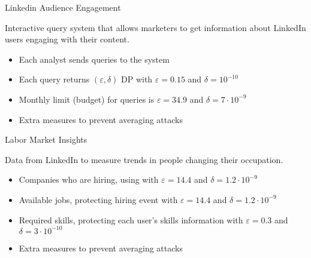 \documentclass[12pt,aspectratio=169,handout]{beamer}
\begin{document}

\begin{frame}{Linkedin Audience Engagement}

Interactive query system that allows marketers to get information about LinkedIn users engaging with their content. 

\begin{itemize} \setlength\itemsep{2mm}
%
\item Each analyst sends queries to the system 
%
\item Each query returns $(\varepsilon, \delta)$ DP with $\varepsilon = 0.15$ and $\delta = 10^{-10}$
%
\item Monthly limit (budget) for queries is $\varepsilon = 34.9$ and $\delta = 7 \cdot 10^{-9}$
%
\item Extra measures to prevent averaging attacks 
\end{itemize}


\end{frame}


\begin{frame}{Labor Market Insights}

Data from LinkedIn to measure trends in people changing their occupation. \vskip2mm 

\begin{itemize} \setlength\itemsep{2mm}
%
\item Companies who are hiring, using with $\varepsilon = 14.4$ and $\delta = 1.2 \cdot 10^{-9}$
%
\item Available jobs, protecting hiring event with $\varepsilon = 14.4$ and $\delta = 1.2 \cdot 10^{-9}$
%
\item Required skills, protecting each user's skills information with $\varepsilon = 0.3$ and $\delta = 3 \cdot 10^{-10}$
%
\item Extra measures to prevent averaging attacks 
\end{itemize}


\end{frame}
\end{document}
